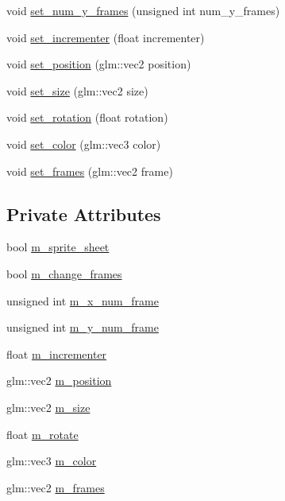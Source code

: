\begin{DoxyCompactItemize}
\item 
void \hyperlink{classsprite_a46329102a20cd83a62a2273a78155ac6}{set\+\_\+num\+\_\+y\+\_\+frames} (unsigned int num\+\_\+y\+\_\+frames)
\item 
void \hyperlink{classsprite_ae3c9856eee554bf235ea32433a9cda60}{set\+\_\+incrementer} (float incrementer)
\item 
void \hyperlink{classsprite_aa1d4e098048948fe81239c01365a0656}{set\+\_\+position} (glm\+::vec2 position)
\item 
void \hyperlink{classsprite_a61c40faac76e6c0a5834c34c55f0e4c4}{set\+\_\+size} (glm\+::vec2 size)
\item 
void \hyperlink{classsprite_ab95aac27f21039f0f8584343687e734b}{set\+\_\+rotation} (float rotation)
\item 
void \hyperlink{classsprite_ad9ead060273297a219478f570e17e399}{set\+\_\+color} (glm\+::vec3 color)
\item 
void \hyperlink{classsprite_aeaf9e60fb358bf55a1dd9be38e841ea5}{set\+\_\+frames} (glm\+::vec2 frame)
\end{DoxyCompactItemize}
\subsection*{Private Attributes}
\begin{DoxyCompactItemize}
\item 
bool \hyperlink{classsprite_a90713ede82ab2256a308feae3ec5e3eb}{m\+\_\+sprite\+\_\+sheet}
\item 
bool \hyperlink{classsprite_a29b0927a7303c9156b9caf753501db06}{m\+\_\+change\+\_\+frames}
\item 
unsigned int \hyperlink{classsprite_a8d67c4d9227e4013248b17a702504660}{m\+\_\+x\+\_\+num\+\_\+frame}
\item 
unsigned int \hyperlink{classsprite_a7322a7d73bc48184721ce0d239aaa586}{m\+\_\+y\+\_\+num\+\_\+frame}
\item 
float \hyperlink{classsprite_aecbf0a0cd9ea195f174be3aaa921f057}{m\+\_\+incrementer}
\item 
glm\+::vec2 \hyperlink{classsprite_ad0672bebb7a8202d38b4e6b6ac940f0a}{m\+\_\+position}
\item 
glm\+::vec2 \hyperlink{classsprite_a8935cb487f4f6990d0dad69074c33c7f}{m\+\_\+size}
\item 
float \hyperlink{classsprite_a0d9b789deca4f552207112656ef62363}{m\+\_\+rotate}
\item 
glm\+::vec3 \hyperlink{classsprite_a4c008267c43c6bafcbc0dd3349d4b1da}{m\+\_\+color}
\item 
glm\+::vec2 \hyperlink{classsprite_af81112db3137186237f617a685498c69}{m\+\_\+frames}
\end{DoxyCompactItemize}


